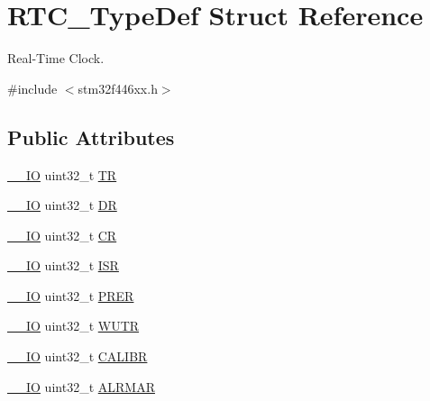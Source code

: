 \hypertarget{struct_r_t_c___type_def}{}\section{R\+T\+C\+\_\+\+Type\+Def Struct Reference}
\label{struct_r_t_c___type_def}


Real-\/\+Time Clock.  




{\ttfamily \#include $<$stm32f446xx.\+h$>$}

\subsection*{Public Attributes}
\begin{DoxyCompactItemize}
\item 
\hyperlink{core__sc300_8h_aec43007d9998a0a0e01faede4133d6be}{\+\_\+\+\_\+\+IO} uint32\+\_\+t \hyperlink{struct_r_t_c___type_def_a2e8783857f8644a4eb80ebc51e1cba42}{TR}
\item 
\hyperlink{core__sc300_8h_aec43007d9998a0a0e01faede4133d6be}{\+\_\+\+\_\+\+IO} uint32\+\_\+t \hyperlink{struct_r_t_c___type_def_a8750eae683cb3d382476dc7cdcd92b96}{DR}
\item 
\hyperlink{core__sc300_8h_aec43007d9998a0a0e01faede4133d6be}{\+\_\+\+\_\+\+IO} uint32\+\_\+t \hyperlink{struct_r_t_c___type_def_a731d9209ce40dce6ea61fcc6f818c892}{CR}
\item 
\hyperlink{core__sc300_8h_aec43007d9998a0a0e01faede4133d6be}{\+\_\+\+\_\+\+IO} uint32\+\_\+t \hyperlink{struct_r_t_c___type_def_a5a7b104d80b48b5708b50cdc487d6a78}{I\+SR}
\item 
\hyperlink{core__sc300_8h_aec43007d9998a0a0e01faede4133d6be}{\+\_\+\+\_\+\+IO} uint32\+\_\+t \hyperlink{struct_r_t_c___type_def_a5f43a11e0873212f598e41db5f2dcf6a}{P\+R\+ER}
\item 
\hyperlink{core__sc300_8h_aec43007d9998a0a0e01faede4133d6be}{\+\_\+\+\_\+\+IO} uint32\+\_\+t \hyperlink{struct_r_t_c___type_def_ad93017bb0a778a2aad9cd71211fc770a}{W\+U\+TR}
\item 
\hyperlink{core__sc300_8h_aec43007d9998a0a0e01faede4133d6be}{\+\_\+\+\_\+\+IO} uint32\+\_\+t \hyperlink{struct_r_t_c___type_def_a2403d29b2bfffb734ebef6642c0d2724}{C\+A\+L\+I\+BR}
\item 
\hyperlink{core__sc300_8h_aec43007d9998a0a0e01faede4133d6be}{\+\_\+\+\_\+\+IO} uint32\+\_\+t \hyperlink{struct_r_t_c___type_def_ad7e54d5c5a4b9fd1e26aca85b1e36c7f}{A\+L\+R\+M\+AR}
\item 

\end{DoxyCompactItemize}
